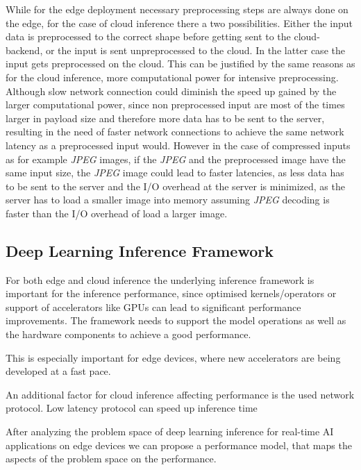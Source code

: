 While for the edge deployment necessary preprocessing steps are always done on the edge, for the case of cloud inference there a two possibilities. Either the input data is preprocessed to the correct shape before getting sent to the cloud-backend, or the input is sent unpreprocessed to the cloud. 
In the latter case the input gets preprocessed on the cloud. 
This can be justified by the same reasons as for the cloud inference, more computational power for intensive preprocessing.
Although slow network connection could diminish the speed up gained by the larger computational power, since non preprocessed input are most of the times larger in payload size and therefore more data has to be sent to the server, resulting in the need of faster network connections to achieve the same network latency as a preprocessed input would.
However in the case of compressed inputs as for example \emph{JPEG} images, if the \emph{JPEG} and the preprocessed image have the same input size, the \emph{JPEG} image could lead to faster latencies, as less data has to be sent to the server and the I/O overhead at the server is minimized, as the server has to load a smaller image into memory assuming \emph{JPEG} decoding is faster than the I/O overhead of load a larger image. 



\subsection{Deep Learning Inference Framework}
For both edge and cloud inference the underlying inference framework is important for the inference performance, since optimised kernels/operators or support of accelerators like GPUs can lead to significant performance improvements.
The framework needs to support the model operations as well as the hardware components to achieve a good performance.


This is especially important for edge devices, where new accelerators are being developed at a fast pace.

An additional factor for cloud inference affecting performance is the used network protocol.
Low latency protocol can speed up inference time 

After analyzing the problem space of deep learning inference for real-time AI applications on edge devices we can propose a performance model, that maps the aspects of the problem space on the performance.



